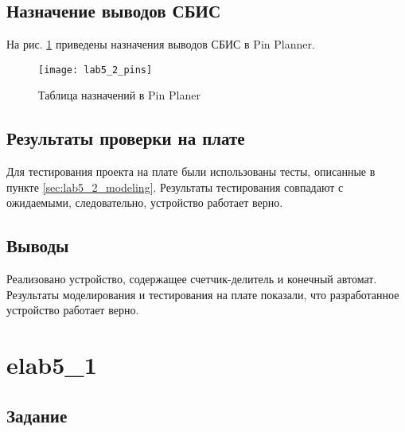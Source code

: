 \subsection{Назначение выводов СБИС}

На рис. \ref{fig:lab5_2_pins} приведены назначения выводов СБИС в Pin Planner.

\begin{figure}[H]
\begin{center}
	\texttt{[image: lab5\_2\_pins]}
	\caption{Таблица назначений в Pin Planer}
	\label{fig:lab5_2_pins}
\end{center}
\end{figure}

\subsection{Результаты проверки на плате}

Для тестирования проекта на плате были использованы тесты, описанные в пункте \ref{sec:lab5_2_modeling}. Результаты тестирования совпадают с ожидаемыми, следовательно, устройство работает верно.

\subsection{Выводы}

Реализовано устройство, содержащее счетчик-делитель и конечный автомат. Результаты моделирования и тестирования на плате показали, что разработанное устройство работает верно.

\newpage

\section{elab5\_1}

\subsection{Задание}

